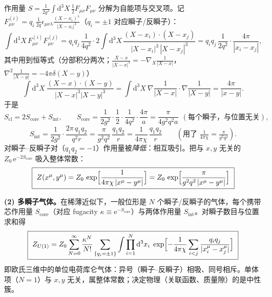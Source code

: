 作用量 $S=\frac{1}{2g^{2}}\int\mathrm{d}^{3}X\,\frac{1}{2}F_{\mu\nu}F_{\mu\nu}$ 分解为自能项与交叉项。记 $F^{(i)}_{\mu\nu}=q_i\,\frac{1}{2q}\epsilon_{\mu\nu\lambda}\frac{(X-x_i)^\lambda}{|X-x_i|^{3}}$（$q_i=\pm1$ 对应瞬子/反瞬子）：
\begin{equation*}
\int\mathrm{d}^{3}X\,F^{(i)}_{\mu\nu}F^{(j)}_{\mu\nu}
=q_iq_j\,\frac{1}{4q^{2}}\cdot2\int\mathrm{d}^{3}X\,
\frac{(X-x_i)\cdot(X-x_j)}{|X-x_i|^{3}\,|X-x_j|^{3}}
=q_iq_j\,\frac{1}{2q^{2}}\cdot\frac{4\pi}{|x_i-x_j|} ,
\end{equation*}
其中用到恒等式（分部积分两次；$\frac{X-x}{|X-x|^{3}}=-\nabla_X\frac{1}{|X-x|}$，$\nabla^{2}\frac{1}{|X-y|}=-4\pi\delta(X-y)$）
\begin{equation*}
\int\mathrm{d}^{3}X\ \frac{(X-x)\cdot(X-y)}{|X-x|^{3}|X-y|^{3}}
=\int\mathrm{d}^{3}X\ \nabla\frac{1}{|X-x|}\cdot\nabla\frac{1}{|X-y|}
=\frac{4\pi}{|x-y|} .
\end{equation*}
于是
\begin{equation*}
S_{\text{cl}}=2S_{\text{core}}+S_{\text{int}},
\qquad
S_{\text{core}}=\frac{1}{2g^{2}}\cdot\frac{1}{2}\cdot\frac{1}{4q^{2}}\cdot\frac{4\pi}{a}
=\frac{\pi}{4g^{2}q^{2}a}\ \ (\text{每个瞬子，与位置无关}),
\end{equation*}
\begin{equation*}
S_{\text{int}}=\frac{1}{2g^{2}}\cdot\frac{2\pi\,q_1q_2}{q^{2}r}
=\frac{\pi}{g^{2}q^{2}}\,\frac{q_1q_2}{r}
=\frac{1}{4\pi\chi}\,\frac{q_1q_2}{r}
\qquad(\text{用了 }\tfrac{1}{4\pi\chi}=\tfrac{\pi}{g^{2}q^{2}}).
\end{equation*}
对瞬子--反瞬子对（$q_1q_2=-1$）作用量被\emph{降低}：相互吸引。把与 $x,y$ 无关的 $Z_0\,\mathrm{e}^{-2S_{\text{core}}}$ 吸入整体常数：
\begin{equation*}
\boxed{\ Z(x^\mu,y^\mu)=Z_0\,\exp\Bigl[\frac{1}{4\pi\chi\,|x^\mu-y^\mu|}\Bigr]
=Z_0\,\exp\Bigl[\frac{\pi}{g^{2}q^{2}\,|x^\mu-y^\mu|}\Bigr]\ }
\end{equation*}

\textbf{(2) 多瞬子气体。}在稀薄近似下，一般位形是 $N$ 个瞬子/反瞬子的气体，每个携带芯作用量 $S_{\text{core}}$（对应 fugacity $\kappa\equiv\mathrm{e}^{-S_{\text{core}}}$）与两体作用量 $S_{\text{int}}$。对瞬子数目与位置求和得
\begin{equation*}
\boxed{\ Z_{U(1)}=Z_0\sum_{N=0}^{\infty}\frac{\kappa^{N}}{N!}
\sum_{\{q_i=\pm1\}}\int\prod_{i=1}^{N}\mathrm{d}^{3}x_i\;
\exp\Bigl[-\frac{1}{4\pi\chi}\sum_{i<j}\frac{q_iq_j}{|x_i^\mu-x_j^\mu|}\Bigr]\ }
\end{equation*}
即欧氏三维中的单位电荷库仑气体：异号（瞬子--反瞬子）相吸、同号相斥。单体项（$N=1$）与 $x,y$ 无关，属整体常数；决定物理（关联函数、质量隙）的是中性簇。

